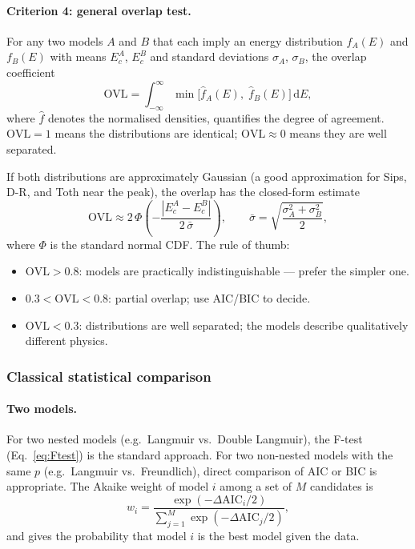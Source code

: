 \documentclass[12pt]{article}
\begin{document}
	\paragraph{Criterion 4: general overlap test.}

	For any two models $A$ and $B$ that each imply an energy
	distribution $f_A(E)$ and $f_B(E)$ with means $E_c^{A}$,
	$E_c^{B}$ and standard deviations $\sigma_A$, $\sigma_B$,
	the overlap coefficient
	\begin{equation}
		\mathrm{OVL}
		= \int_{-\infty}^{\infty}
		\min\!\bigl[\hat{f}_A(E),\;\hat{f}_B(E)\bigr]\,\mathrm{d}E,
		\label{eq:OVL}
	\end{equation}
	where $\hat{f}$ denotes the normalised densities, quantifies the
	degree of agreement. $\mathrm{OVL} = 1$ means the distributions
	are identical; $\mathrm{OVL} \approx 0$ means they are well
	separated.

	If both distributions are approximately Gaussian (a good
	approximation for Sips, D-R, and Toth near the peak), the overlap
	has the closed-form estimate
	\begin{equation}
		\mathrm{OVL}
		\approx 2\,\Phi\!\left(
		-\frac{|E_c^A - E_c^B|}{2\,\bar{\sigma}}
		\right),
		\qquad
		\bar{\sigma}
		= \sqrt{\frac{\sigma_A^2 + \sigma_B^2}{2}},
		\label{eq:OVL_gauss}
	\end{equation}
	where $\Phi$ is the standard normal CDF. The rule of thumb:
	\begin{itemize}
		\item $\mathrm{OVL} > 0.8$: models are practically
		indistinguishable --- prefer the simpler one.
		\item $0.3 < \mathrm{OVL} < 0.8$: partial overlap; use
		AIC/BIC to decide.
		\item $\mathrm{OVL} < 0.3$: distributions are well separated;
		the models describe qualitatively different physics.
	\end{itemize}

	\subsubsection{Classical statistical comparison}

	\paragraph{Two models.}
	For two nested models (e.g.\ Langmuir vs.\ Double Langmuir),
	the F-test (Eq.~\eqref{eq:Ftest}) is the standard approach.
	For two non-nested models with the same $p$ (e.g.\ Langmuir vs.\
	Freundlich), direct comparison of AIC or BIC is appropriate.
	The Akaike weight of model $i$ among a set of $M$ candidates is
	\begin{equation}
		w_i = \frac{\exp(-\Delta\mathrm{AIC}_i / 2)}
		{\displaystyle\sum_{j=1}^{M}
			\exp(-\Delta\mathrm{AIC}_j / 2)},
		\label{eq:Akaike_weight}
	\end{equation}
	and gives the probability that model $i$ is the best model given
	the data.
\end{document}
